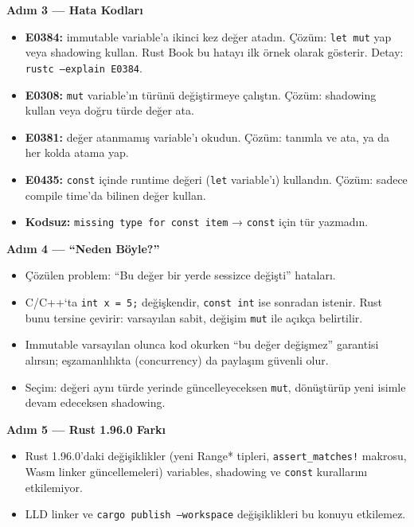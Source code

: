 \documentclass[12pt,a4paper]{article}
\begin{document}
\textbf{Adım 3 --- Hata Kodları}

\begin{itemize}
\tightlist
\item
  \textbf{E0384:} immutable variable'a ikinci kez değer atadın. Çözüm: \texttt{let\ mut} yap veya shadowing kullan. Rust Book bu hatayı ilk örnek olarak gösterir. Detay: \texttt{rustc\ --explain\ E0384}.
\item
  \textbf{E0308:} \texttt{mut} variable'ın türünü değiştirmeye çalıştın. Çözüm: shadowing kullan veya doğru türde değer ata.
\item
  \textbf{E0381:} değer atanmamış variable'ı okudun. Çözüm: tanımla ve ata, ya da her kolda atama yap.
\item
  \textbf{E0435:} \texttt{const} içinde runtime değeri (\texttt{let} variable'ı) kullandın. Çözüm: sadece compile time'da bilinen değer kullan.
\item
  \textbf{Kodsuz:} \texttt{missing\ type\ for\ const\ item} → \texttt{const} için tür yazmadın.
\end{itemize}

\textbf{Adım 4 --- ``Neden Böyle?''}

\begin{itemize}
\tightlist
\item
  Çözülen problem: ``Bu değer bir yerde sessizce değişti'' hataları.
\item
  C/C++`ta \texttt{int\ x\ =\ 5;} değişkendir, \texttt{const\ int} ise sonradan istenir. Rust bunu tersine çevirir: varsayılan sabit, değişim \texttt{mut} ile açıkça belirtilir.
\item
  Immutable varsayılan olunca kod okurken ``bu değer değişmez'' garantisi alırsın; eşzamanlılıkta (concurrency) da paylaşım güvenli olur.
\item
  Seçim: değeri aynı türde yerinde güncelleyeceksen \texttt{mut}, dönüştürüp yeni isimle devam edeceksen shadowing.
\end{itemize}

\textbf{Adım 5 --- Rust 1.96.0 Farkı}

\begin{itemize}
\tightlist
\item
  Rust 1.96.0'daki değişiklikler (yeni Range* tipleri, \texttt{assert\_matches!} makrosu, Wasm linker güncellemeleri) variables, shadowing ve \texttt{const} kurallarını etkilemiyor.
\item
  LLD linker ve \texttt{cargo\ publish\ --workspace} değişiklikleri bu konuyu etkilemez.
\end{itemize}
\end{document}
